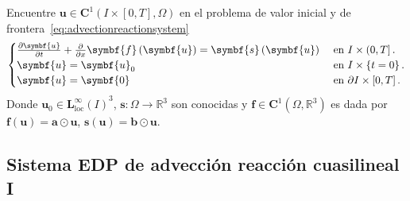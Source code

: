 Encuentre
\begin{math}
	\symbf{u}\in
	\symbf{C}^{1}\left(I\times\left[0,T\right],\Omega\right)
\end{math}
en el problema de valor inicial y de frontera~\eqref{eq:advectionreactionsystem}
\begin{equation}\label{eq:advectionreactionsystem}
	\begin{cases}
		\diffp{\symbf{u}}{t}+
		\diffp{}{x}\symbf{f}\left(\symbf{u}\right)               =
		\symbf{s}\left(\symbf{u}\right) &
		\text{ en }I\times\left(0,T\right].   \\
		\symbf{u}                                                                     =
		\symbf{u}_{0}                   &
		\text{ en }I\times\left\{t=0\right\}. \\
		\symbf{u}                                                                     =
		\symbf{0}                       &
		\text{ en }\partial I\times\left[0,T\right].
	\end{cases}
\end{equation}
Donde
\begin{math}
	\symbf{u}_{0}\in
	{\symbf{L}^{\infty}_{\text{loc}}\left(I\right)}^{3}
\end{math},
\begin{math}
	\symbf{s}\colon\Omega\to
	\mathbb{R}^{3}
\end{math}
son conocidas y
\begin{math}
	\symbf{f}\in
	\symbf{C}^{1}\left(\Omega,\mathbb{R}^{3}\right)
\end{math}
es dada por
\begin{math}
	\symbf{f}\left(\symbf{u}\right)=
	\symbf{a}\odot\symbf{u}
\end{math},
\begin{math}
	\symbf{s}\left(\symbf{u}\right)=
	\symbf{b}\odot\symbf{u}
\end{math}.

\subsection*{Sistema EDP de advección reacción cuasilineal I}

